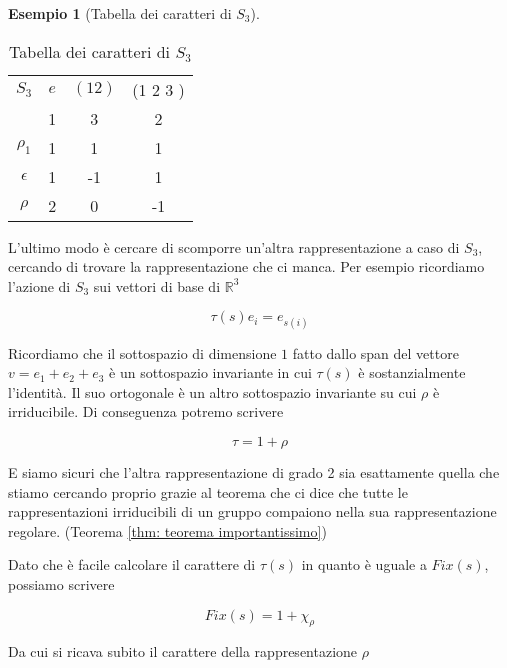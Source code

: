 \documentclass[11pt]{article}
\theoremstyle{plain}
\theoremstyle{definition}
\newtheorem{exmp}{Esempio}[section]
\theoremstyle{remark}
\begin{document}
\begin{exmp}[Tabella dei caratteri di $S_3$]
\begin{table}[!ht]
\centering
\begin{tabular}{|c|c|c|c|}
\hline
$S_3$  & $e$ & $(1 2)$ & (1 2 3 )    \\
 & 1 & 3 & 2 \\
\hline
 $\rho_1$ & 1 & 1  & 1 \\
\hline
$\epsilon$ & 1 & -1 & 1 \\
\hline
$\rho$ & 2 & 0 & -1 \\
\hline
\end{tabular}
\caption{Tabella dei caratteri di $S_3$}
\label{tabella caratteri s3}
\end{table}

L'ultimo modo è cercare di scomporre un'altra rappresentazione a caso di $S_3$, cercando di trovare la rappresentazione che ci manca. Per esempio ricordiamo l'azione di $S_3$ sui vettori di base di $\mathbb{R}^3$

\[ \tau(s) e_i = e_{s(i)}\]

Ricordiamo che il sottospazio di dimensione $1$ fatto dallo span del vettore $v = e_1 + e_2 + e_3$ è un sottospazio invariante in cui $\tau(s)$ è sostanzialmente l'identità. Il suo ortogonale è un altro sottospazio invariante su cui $\rho$ è irriducibile. Di conseguenza potremo scrivere

\[ \tau = 1 + \rho\]

E siamo sicuri che l'altra rappresentazione di grado 2 sia esattamente quella che stiamo cercando proprio grazie al teorema che ci dice che tutte le rappresentazioni irriducibili di un gruppo compaiono nella sua rappresentazione regolare. (Teorema \ref{thm: teorema importantissimo})

Dato che è facile calcolare il carattere di $\tau(s)$ in quanto è uguale a $Fix(s)$, possiamo scrivere

\[ Fix(s) = 1 + \chi_\rho\]

Da cui si ricava subito il carattere della rappresentazione $\rho$



\end{exmp}
\end{document}
